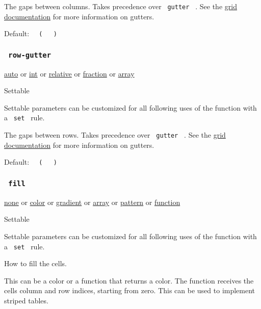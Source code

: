 The gaps between columns. Takes precedence over \texttt{\ gutter\ } .
See the \href{/docs/reference/layout/grid/}{grid documentation} for more
information on gutters.

Default:
\texttt{\ }{\texttt{\ (\ }}\texttt{\ }{\texttt{\ )\ }}\texttt{\ }

\subsubsection{\texorpdfstring{\texttt{\ row-gutter\ }}{ row-gutter }}\label{parameters-row-gutter}

\href{/docs/reference/foundations/auto/}{auto} {or}
\href{/docs/reference/foundations/int/}{int} {or}
\href{/docs/reference/layout/relative/}{relative} {or}
\href{/docs/reference/layout/fraction/}{fraction} {or}
\href{/docs/reference/foundations/array/}{array}

{{ Settable }}

\label{parameters-row-gutter-settable-tooltip}
Settable parameters can be customized for all following uses of the
function with a \texttt{\ set\ } rule.

The gaps between rows. Takes precedence over \texttt{\ gutter\ } . See
the \href{/docs/reference/layout/grid/}{grid documentation} for more
information on gutters.

Default:
\texttt{\ }{\texttt{\ (\ }}\texttt{\ }{\texttt{\ )\ }}\texttt{\ }

\subsubsection{\texorpdfstring{\texttt{\ fill\ }}{ fill }}\label{parameters-fill}

\href{/docs/reference/foundations/none/}{none} {or}
\href{/docs/reference/visualize/color/}{color} {or}
\href{/docs/reference/visualize/gradient/}{gradient} {or}
\href{/docs/reference/foundations/array/}{array} {or}
\href{/docs/reference/visualize/pattern/}{pattern} {or}
\href{/docs/reference/foundations/function/}{function}

{{ Settable }}

\label{parameters-fill-settable-tooltip}
Settable parameters can be customized for all following uses of the
function with a \texttt{\ set\ } rule.

How to fill the cells.

This can be a color or a function that returns a color. The function
receives the cells\textquotesingle{} column and row indices, starting
from zero. This can be used to implement striped tables.

